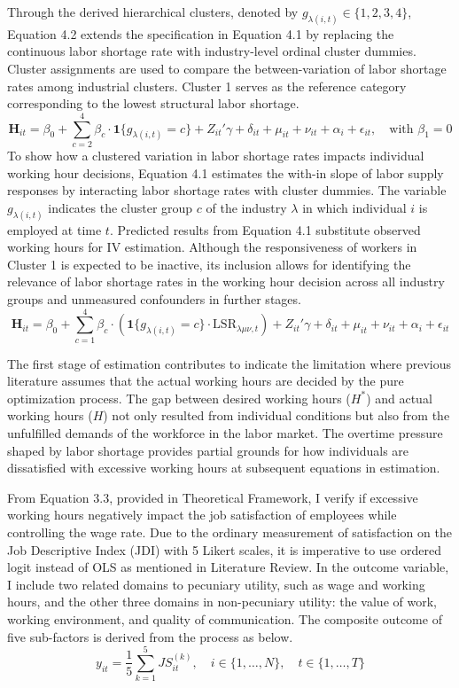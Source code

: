 \documentclass[
  12pt,
]{article}
\begin{document}
Through the derived hierarchical clusters, denoted by
\(g_{\lambda(i,t)} \in \{1,2,3,4\}\), Equation 4.2 extends the
specification in Equation 4.1 by replacing the continuous labor shortage
rate with industry-level ordinal cluster dummies. Cluster assignments
are used to compare the between-variation of labor shortage rates among
industrial clusters. Cluster 1 serves as the reference category
corresponding to the lowest structural labor shortage. \[
\mathbf{H}_{it} = \beta_0 + \sum_{c=2}^{4} \beta_c \cdot \mathbf{1}\{g_{\lambda(i,t)} = c\} + Z_{it}' \gamma + \delta_{it} + \mu_{it} + \nu_{it} + \alpha_i + \epsilon_{it},
\quad \text{with } \beta_1 = 0
\tag{4.2}
\] To show how a clustered variation in labor shortage rates impacts
individual working hour decisions, Equation 4.1 estimates the with-in
slope of labor supply responses by interacting labor shortage rates with
cluster dummies. The variable \(g_{\lambda(i,t)}\) indicates the cluster
group \(c\) of the industry \(\lambda\) in which individual \(i\) is
employed at time \(t\). Predicted results from Equation 4.1 substitute
observed working hours for IV estimation. Although the responsiveness of
workers in Cluster 1 is expected to be inactive, its inclusion allows
for identifying the relevance of labor shortage rates in the working
hour decision across all industry groups and unmeasured confounders in
further stages. \[
\mathbf{H}_{it} = \beta_0 + \sum_{c=1}^{4} \beta_c \cdot \left(\mathbf{1}\{g_{\lambda(i,t)} = c\} \cdot \text{LSR}_{\lambda\mu\nu,t} \right) + Z_{it}' \gamma + \delta_{it} + \mu_{it} + \nu_{it} + \alpha_i + \epsilon_{it}
\tag{4.3}
\]

The first stage of estimation contributes to indicate the limitation
where previous literature assumes that the actual working hours are
decided by the pure optimization process. The gap between desired
working hours (\(H^*\)) and actual working hours (\(H\)) not only
resulted from individual conditions but also from the unfulfilled
demands of the workforce in the labor market. The overtime pressure
shaped by labor shortage provides partial grounds for how individuals
are dissatisfied with excessive working hours at subsequent equations in
estimation.

From Equation 3.3, provided in Theoretical Framework, I verify if
excessive working hours negatively impact the job satisfaction of
employees while controlling the wage rate. Due to the ordinary
measurement of satisfaction on the Job Descriptive Index (JDI) with 5
Likert scales, it is imperative to use ordered logit instead of OLS as
mentioned in Literature Review. In the outcome variable, I include two
related domains to pecuniary utility, such as wage and working hours,
and the other three domains in non-pecuniary utility: the value of work,
working environment, and quality of communication. The composite outcome
of five sub-factors is derived from the process as below. \[
y_{it} =  \frac{1}{5} \sum_{k=1}^{5} JS_{it}^{(k)}, \quad i \in \{1, \dots, N\}, \quad t \in \{1, \dots, T\}
\]
\end{document}
